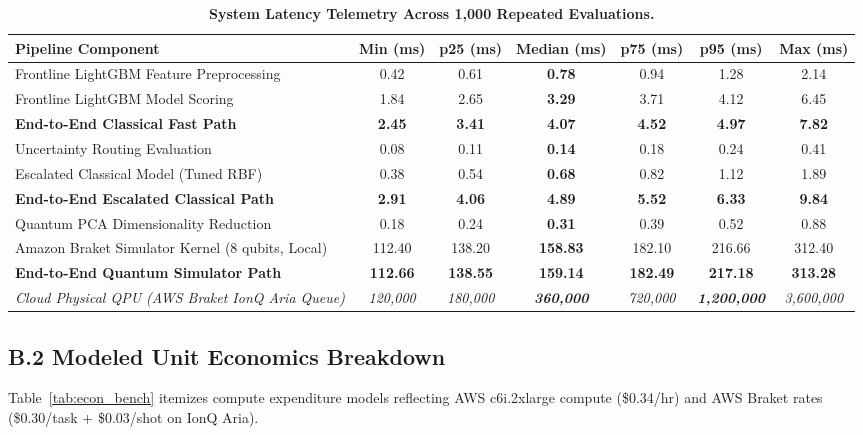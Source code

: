 \documentclass[10pt,a4paper]{article}
\begin{document}
\vspace{-2pt}
\begin{table}[h!]
\centering
\renewcommand{\arraystretch}{0.76}
\caption{\textbf{System Latency Telemetry Across 1,000 Repeated Evaluations.}}
\label{tab:lat_bench}
\vspace{1pt}
\begin{tabularx}{\linewidth}{@{}lcccccc@{}}
\toprule
\textbf{Pipeline Component} & \textbf{Min (ms)} & \textbf{p25 (ms)} & \textbf{Median (ms)} & \textbf{p75 (ms)} & \textbf{p95 (ms)} & \textbf{Max (ms)} \\
\midrule
Frontline LightGBM Feature Preprocessing & 0.42 & 0.61 & \textbf{0.78} & 0.94 & 1.28 & 2.14 \\
Frontline LightGBM Model Scoring & 1.84 & 2.65 & \textbf{3.29} & 3.71 & 4.12 & 6.45 \\
\textbf{End-to-End Classical Fast Path} & \textbf{2.45} & \textbf{3.41} & \textbf{4.07} & \textbf{4.52} & \textbf{4.97} & \textbf{7.82} \\
\midrule
Uncertainty Routing Evaluation & 0.08 & 0.11 & \textbf{0.14} & 0.18 & 0.24 & 0.41 \\
Escalated Classical Model (Tuned RBF) & 0.38 & 0.54 & \textbf{0.68} & 0.82 & 1.12 & 1.89 \\
\textbf{End-to-End Escalated Classical Path} & \textbf{2.91} & \textbf{4.06} & \textbf{4.89} & \textbf{5.52} & \textbf{6.33} & \textbf{9.84} \\
\midrule
Quantum PCA Dimensionality Reduction & 0.18 & 0.24 & \textbf{0.31} & 0.39 & 0.52 & 0.88 \\
Amazon Braket Simulator Kernel (8 qubits, Local) & 112.40 & 138.20 & \textbf{158.83} & 182.10 & 216.66 & 312.40 \\
\textbf{End-to-End Quantum Simulator Path} & \textbf{112.66} & \textbf{138.55} & \textbf{159.14} & \textbf{182.49} & \textbf{217.18} & \textbf{313.28} \\
\midrule
\textit{Cloud Physical QPU (AWS Braket IonQ Aria Queue)} & \textit{120,000} & \textit{180,000} & \textit{\textbf{360,000}} & \textit{720,000} & \textit{\textbf{1,200,000}} & \textit{3,600,000} \\
\bottomrule
\end{tabularx}
\end{table}
\vspace{-5pt}

\subsection*{B.2 Modeled Unit Economics Breakdown}
Table~\ref{tab:econ_bench} itemizes compute expenditure models reflecting AWS c6i.2xlarge compute (\$0.34/hr) and AWS Braket rates (\$0.30/task + \$0.03/shot on IonQ Aria).
\end{document}
